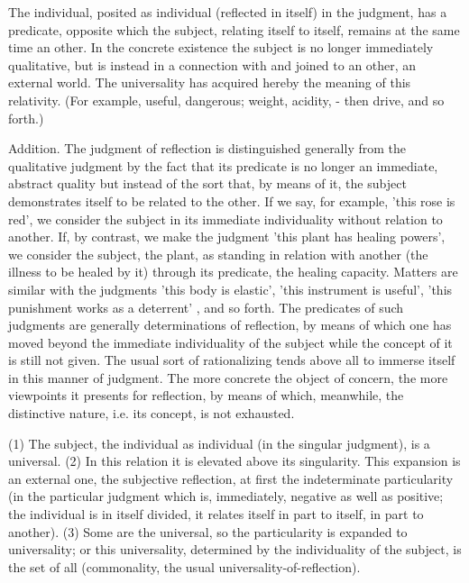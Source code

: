 The individual, posited as individual (reflected in itself) in the judgment,
has a predicate, opposite which the subject, relating itself to itself,
remains at the same time an other.
In the concrete existence the subject is no longer immediately qualitative,
but is instead in a connection with and joined to an other, an external world.
The universality has acquired hereby the meaning of this relativity.
(For example, useful, dangerous; weight, acidity, - then drive, and so forth.)

Addition. The judgment of reflection is distinguished generally from the
qualitative judgment by the fact that its predicate is no longer an immediate, abstract
quality but instead of the sort that, by means of it, the subject demonstrates itself
to be related to the other. If we say, for example, 'this rose is red', we consider the
subject in its immediate individuality without relation to another. If, by contrast,
we make the judgment 'this plant has healing powers', we consider the subject, the
plant, as standing in relation with another (the illness to be healed by it) through
its predicate, the healing capacity. Matters are similar with the judgments 'this
body is elastic', 'this instrument is useful', 'this punishment works as a deterrent' ,
and so forth. The predicates of such judgments are generally determinations of
reflection, by means of which one has moved beyond the immediate individuality
of the subject while the concept of it is still not given.
The usual sort of rationalizing tends above all to immerse itself in this manner of judgment.
The more concrete the object of concern, the more viewpoints it presents for
reflection, by means of which, meanwhile, the distinctive nature, i.e. its concept,
is not exhausted.

(1) The subject, the individual as individual (in the singular judgment), is a universal.
(2) In this relation it is elevated above its singularity.
This expansion is an external one, the subjective reflection,
at first the indeterminate particularity
(in the particular judgment which is, immediately, negative as well as positive;
the individual is in itself divided, it relates itself in part to itself, in part to another).
(3) Some are the universal, so the particularity is expanded to universality;
or this universality, determined by the individuality of the subject,
is the set of all (commonality, the usual universality-of-reflection).

